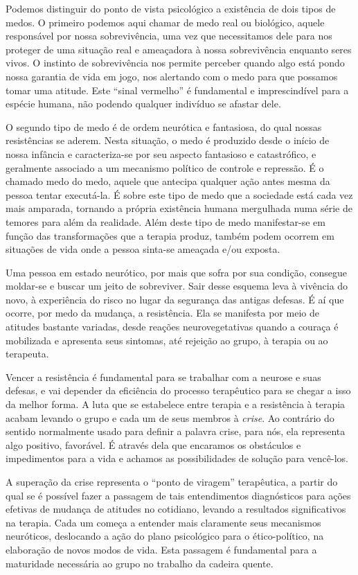 Podemos distinguir do ponto de vista psicológico a existência de dois
tipos de medos. O primeiro podemos aqui chamar de medo real ou
biológico, aquele responsável por nossa sobrevivência, uma vez que
necessitamos dele para nos proteger de uma situação real e ameaçadora à
nossa sobrevivência enquanto seres vivos. O instinto de sobrevivência
nos permite perceber quando algo está pondo nossa garantia de vida em
jogo, nos alertando com o medo para que possamos tomar uma atitude. Este
``sinal vermelho'' é fundamental e imprescindível para a espécie humana,
não podendo qualquer indivíduo se afastar dele.

O segundo tipo de medo é de ordem neurótica e fantasiosa, do qual nossas
resistências se aderem. Nesta situação, o medo é produzido desde o
início de nossa infância e caracteriza-se por seu aspecto fantasioso e
catastrófico, e geralmente associado a um mecanismo político de controle
e repressão. É o chamado medo do medo, aquele que antecipa qualquer ação
antes mesma da pessoa tentar executá-la. É sobre este tipo de medo que a
sociedade está cada vez mais amparada, tornando a própria existência
humana mergulhada numa série de temores para além da realidade. Além
deste tipo de medo manifestar-se em função das transformações que a
terapia produz, também podem ocorrem em situações de vida onde a pessoa
sinta-se ameaçada e/ou exposta.

Uma pessoa em estado neurótico, por mais que sofra por sua condição,
consegue moldar-se e buscar um jeito de sobreviver. Sair desse esquema
leva à vivência do novo, à experiência do risco no lugar da segurança
das antigas defesas. É aí que ocorre, por medo da mudança, a
resistência. Ela se manifesta por meio de atitudes bastante variadas,
desde reações neurovegetativas quando a couraça é mobilizada e apresenta
seus sintomas, até rejeição ao grupo, à terapia ou ao terapeuta.

Vencer a resistência é fundamental para se trabalhar com a neurose e
suas defesas, e vai depender da eficiência do processo terapêutico para
se chegar a isso da melhor forma. A luta que se estabelece entre terapia
e a resistência à terapia acabam levando o grupo e cada um de seus
membros à \emph{crise}. Ao contrário do sentido normalmente usado para
definir a palavra crise, para nós, ela representa algo positivo,
favorável. É através dela que encaramos os obstáculos e impedimentos
para a vida e achamos as possibilidades de solução para vencê-los.

A superação da crise representa o ``ponto de viragem'' terapêutica, a
partir do qual se é possível fazer a passagem de tais entendimentos
diagnósticos para ações efetivas de mudança de atitudes no cotidiano,
levando a resultados significativos na terapia. Cada um começa a
entender mais claramente seus mecanismos neuróticos, deslocando a ação
do plano psicológico para o ético-político, na elaboração de novos modos
de vida. Esta passagem é fundamental para a maturidade necessária ao
grupo no trabalho da cadeira quente.

